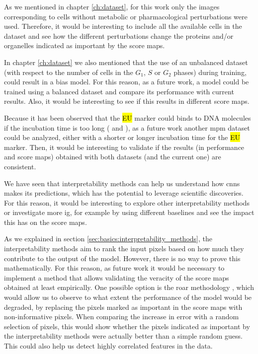 


As we mentioned in chapter \ref{ch:dataset}, for this work only the images corresponding to cells without metabolic or pharmacological perturbations were used. Therefore, it would be interesting to include all the available cells in the dataset and see how the different perturbations change the proteins and/or organelles indicated as important by the score maps.

In chapter \ref{ch:dataset} we also mentioned that the use of an unbalanced dataset (with respect to the number of cells in the $G_1$, $S$ or $G_2$ phases) during training, could result in a bias model. For this reason, as a future work, a model could be trained using a balanced dataset and compare its performance with current results. Also, it would be interesting to see if this results in different score maps.

Because it has been observed that the \hl{EU} marker could binds to DNA molecules if the incubation time is too long (\cite{jao2008exploring} and \cite{bao2018capturing}), as a future work another \gls{mpm} dataset could be analyzed, either with a shorter or longer incubation time for the \hl{EU} marker. Then, it would be interesting to validate if the results (in performance and score maps) obtained with both datasets (and the current one) are consistent.

We have seen that interpretability methods can help us understand how \glspl{cnn} makes its predictions, which has the potential to leverage scientific discoveries.
For this reason, it would be interesting to explore other interpretability methods or investigate more \gls{ig}, for example by using  different baselines and see the impact this has on the score maps.

As we explained in section \ref{sec:basics:interpretability_methods}, the interpretability methods aim to rank the input pixels based on how much they contribute to the output of the model.
However, there is no way to prove this mathematically. For this reason, as future work it would be necessary to implement a method that allows validating the veracity of the score maps obtained at least empirically.
One possible option is the \gls{roar} methodology \cite{hooker2018benchmark}, which would allow us to observe to what extent the performance of the model would be degraded, by replacing the pixels marked as important in the score maps with non-informative pixels. When comparing the increase in error with a random selection of pixels, this would show whether the pixels indicated as important by the interpretability methods were actually better than a simple random guess. This could also help us detect highly correlated features in the data.

